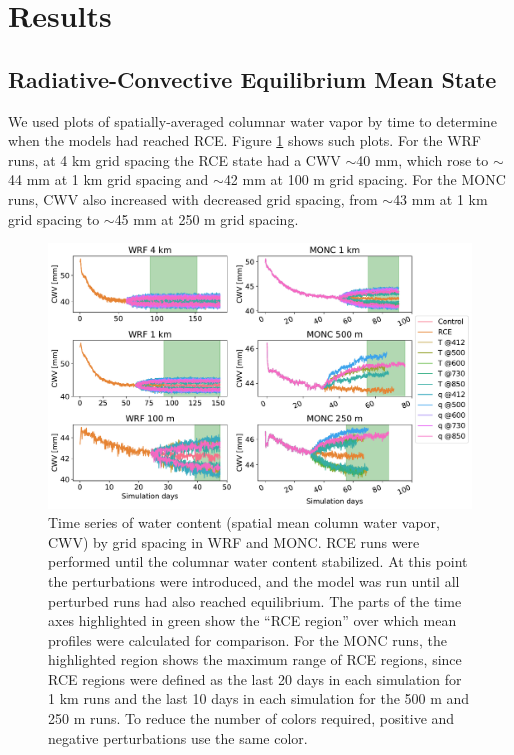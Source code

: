 \documentclass[draft]{agujournal2019}
\begin{document}
\section{Results}
\label{sec:results}

\subsection{Radiative-Convective Equilibrium Mean State}

We used plots of spatially-averaged columnar water vapor by time to determine
when the models had reached RCE. Figure \ref{fig:rce_pw} shows such plots. For
the WRF runs, at 4 km grid spacing the RCE state had a CWV $\sim$40 mm, which
rose to $\sim$44 mm at 1 km grid spacing and $\sim$42 mm at 100 m grid spacing.
For the MONC runs, CWV also increased with decreased grid spacing, from $\sim$43
mm at 1 km grid spacing to $\sim$45 mm at 250 m grid spacing.

\begin{figure}[pth]
    \noindent\includegraphics[width=\textwidth]{figures/runs_timeseries.pdf}
    \caption{Time series of water content (spatial mean column water vapor, CWV)
    by grid spacing in WRF and MONC. RCE runs were performed until the columnar
    water content stabilized. At this point the perturbations were introduced,
    and the model was run until all perturbed runs had also reached equilibrium.
    The parts of the time axes highlighted in green show the ``RCE region'' over
    which mean profiles were calculated for comparison. For the MONC runs, the
    highlighted region shows the maximum range of RCE regions, since RCE regions
    were defined as the last 20 days in each simulation for 1 km runs and the
    last 10 days in each simulation for the 500 m and 250 m runs. To reduce the
    number of colors required, positive and negative perturbations use the same
    color.}
    \label{fig:rce_pw}
\end{figure}
\end{document}

